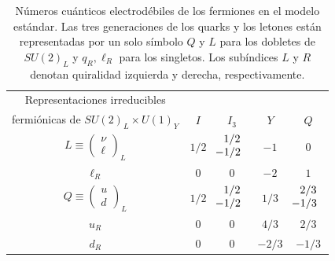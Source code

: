 \begin{table}[h]
\caption[\hspace{-0.15in}Números cuánticos del Modelo Estándar]{Números cuánticos electrodébiles de los fermiones en el modelo estándar. Las tres generaciones de los quarks y los letones están representadas por un solo símbolo $Q$ y $L$ para los dobletes de $SU(2)_L$ y $q_R,\ell_R$ para los singletos. Los subíndices $L$ y $R$ denotan quiralidad izquierda y derecha, respectivamente.}
\begin{center}
\begin{small}
\begin{tabular}{|c | c | c | c | c|} 
 \hline
 Representaciones irreducibles & & & & \\ fermiónicas de $SU(2)_L \times U(1)_Y$ & $I$ & $I_3$ & $Y$ & $Q$ \\ [1ex] 
 \hline\hline
 $L \equiv 
	\begin{pmatrix}
	\nu \\
	\ell 
	\end{pmatrix}_L $ & $1/2$ & $\begin{array}{c} 1/2 \\ \hspace{-0.1in} -1/2 \end{array}$	 & \hspace{-0.1in} $-1$ & $0$ \\ 
[1ex]
 \hline
 $\ell_R$ & $0$ & $0$ & \hspace{-0.1in} $-2$ & $1$ \\ [0.25ex] 
 \hline
  $Q \equiv 
	\begin{pmatrix}
	u \\
	d 
	\end{pmatrix}_L $ & $1/2$ & $\begin{array}{c} 1/2 \\ \hspace{-0.1in} -1/2 \end{array}$	 & $1/3$ & $\begin{array}{c} 2/3 \\ \hspace{-0.1in} -1/3 \end{array}$ \\ 
[1ex]
 \hline
  $u_R$ & $0$ & $0$ & $4/3$ & $2/3$ \\ [0.25ex] 
 \hline
 $d_R$ & $0$ & $0$ & \hspace{-0.1in} $-2/3$ & \hspace{-0.1in} $ -1/3$ \\ [0.25ex] 
 \hline
\end{tabular}
\end{small}
\label{table1}
\end{center}
\end{table}


